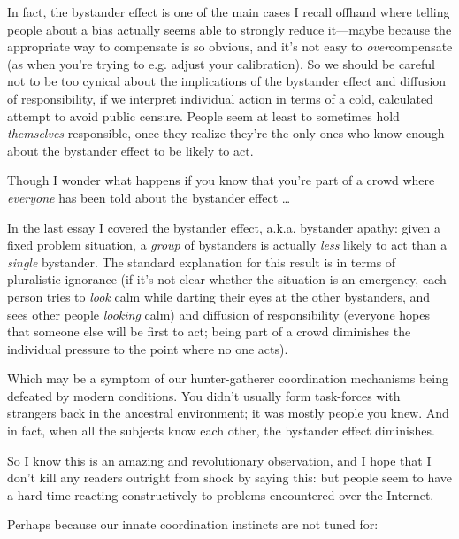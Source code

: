 {
 In fact, the bystander effect is one of the main cases I recall
offhand where telling people about a bias actually seems able to
strongly reduce it---maybe because the appropriate way to compensate is
so obvious, and it's not easy to
\textit{over}compensate (as when you're trying to e.g.
adjust your calibration). So we should be careful not to be too cynical
about the implications of the bystander effect and diffusion of
responsibility, if we interpret individual action in terms of a cold,
calculated attempt to avoid public censure. People seem at least to
sometimes hold \textit{themselves} responsible, once they realize
they're the only ones who know enough about the
bystander effect to be likely to act.}

{
 Though I wonder what happens if you know that
you're part of a crowd where \textit{everyone} has been
told about the bystander effect \ldots}

\myendsectiontext


\bigskip


{
 In the last essay I covered the bystander effect, a.k.a. bystander
apathy: given a fixed problem situation, a \textit{group} of bystanders
is actually \textit{less} likely to act than a \textit{single}
bystander. The standard explanation for this result is in terms of
pluralistic ignorance (if it's not clear whether the
situation is an emergency, each person tries to \textit{look} calm
while darting their eyes at the other bystanders, and sees other people
\textit{looking} calm) and diffusion of responsibility (everyone hopes
that someone else will be first to act; being part of a crowd
diminishes the individual pressure to the point where no one acts). }

{
 Which may be a symptom of our hunter-gatherer coordination
mechanisms being defeated by modern conditions. You
didn't usually form task-forces with strangers back in
the ancestral environment; it was mostly people you knew. And in fact,
when all the subjects know each other, the bystander effect
diminishes.}

{
 So I know this is an amazing and revolutionary observation, and I
hope that I don't kill any readers outright from shock
by saying this: but people seem to have a hard time reacting
constructively to problems encountered over the Internet.}

{
 Perhaps because our innate coordination instincts are not tuned
for:}

